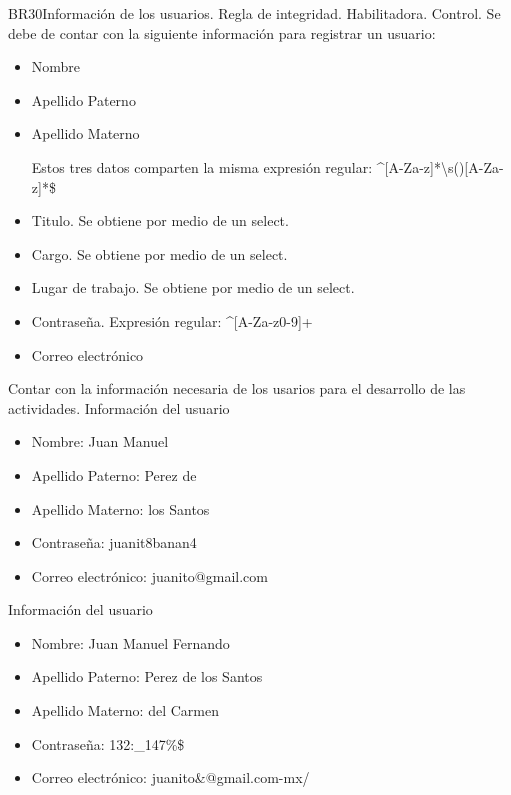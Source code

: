 \begin{BussinesRule}{BR30}{Información de los usuarios.}
    \BRitem[Tipo:] Regla de integridad.
    \BRitem[Clase:] Habilitadora.
    \BRitem[Nivel:] Control.
    \BRitem[Descripción:]Se debe de contar con la siguiente información para registrar un usuario:
    \begin{itemize}
        \item Nombre
        \item Apellido Paterno
        \item Apellido Materno

        Estos tres datos comparten la misma expresión regular:
        \^{}[A-Za-z]*\textbackslash{}s()[A-Za-z]*\$

        \item Titulo. Se obtiene por medio de un select.
        \item Cargo. Se obtiene por medio de un select.
        \item Lugar de trabajo. Se obtiene por medio de un select.
        \item Contraseña. Expresión regular: \^{}[A-Za-z0-9]+

        \item Correo electrónico
    \end{itemize}
    \BRitem[Motivación:] Contar con la información necesaria de los usarios para el desarrollo de las actividades.
     Información del usuario
    \begin{itemize}
        \item Nombre: Juan Manuel
        \item Apellido Paterno: Perez de
        \item Apellido Materno: los Santos
        \item Contraseña: juanit8banan4
        \item Correo electrónico: juanito@gmail.com
    \end{itemize}
     Información del usuario
    \begin{itemize}
        \item Nombre: Juan Manuel Fernando
        \item Apellido Paterno: Perez de los Santos
        \item Apellido Materno: del Carmen
        \item Contraseña: 132:\_147\%\$
        \item Correo electrónico: juanito\&@gmail.com-mx/
    \end{itemize}
 \end{BussinesRule}

